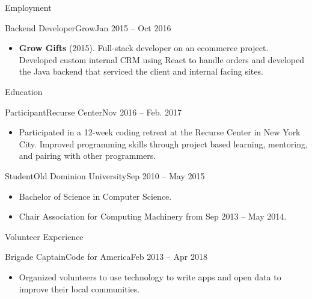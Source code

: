 \documentclass[]{mcdowellcv}
\begin{document}
\begin{cvsection}{Employment}
        \begin{cvsubsection}{Backend Developer}{Grow}{Jan 2015 – Oct 2016}
            \begin{itemize}
                \item \textbf{Grow Gifts} (2015). Full-stack developer on an ecommerce project. Developed custom internal CRM using React to handle orders and developed the Java backend that serviced the client and internal facing sites.
            \end{itemize}
        \end{cvsubsection}
    \end{cvsection}

    \begin{cvsection}{Education}
        \begin{cvsubsection}{Participant}{Recurse Center}{Nov 2016 – Feb. 2017}
            \begin{itemize}
                \item Participated in a 12-week coding retreat at the Recurse Center in New York City.\newline 
                Improved programming skills through project based learning, mentoring, and pairing with other programmers.
            \end{itemize}
        \end{cvsubsection}
        \begin{cvsubsection}{Student}{Old Dominion University}{Sep 2010 – May 2015}
            \begin{itemize}
                \item Bachelor of Science in Computer Science.
                \item Chair Association for Computing Machinery from Sep 2013 – May 2014.
            \end{itemize}
        \end{cvsubsection}
    \end{cvsection}

    \begin{cvsection}{Volunteer Experience}
        \begin{cvsubsection}{Brigade Captain}{Code for America}{Feb 2013 – Apr 2018}
            \begin{itemize}
                \item Organized volunteers to use technology to write apps and open data to improve their local communities.
            \end{itemize}

        \end{cvsubsection}

    \end{cvsection}
\end{document}
